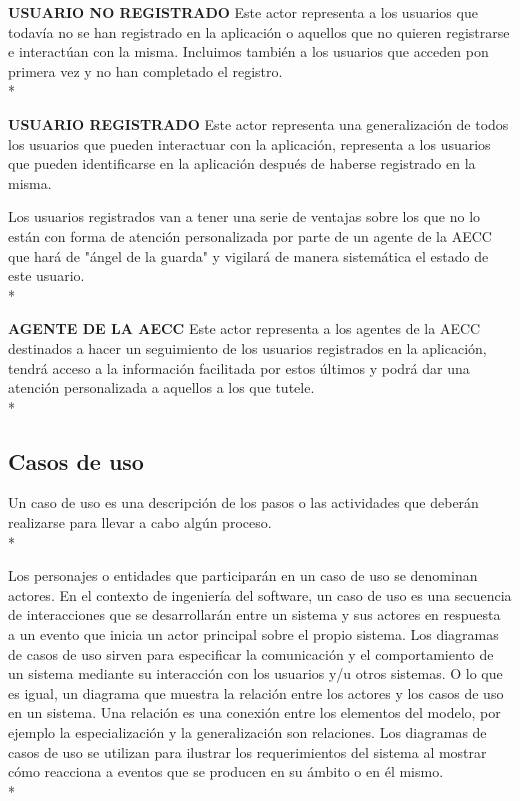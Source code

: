 \documentclass[../pfc.tex]{subfiles}
\begin{document}
	\textbf{USUARIO NO REGISTRADO}
	Este actor representa a los usuarios que todavía no se han registrado en la aplicación o aquellos que no quieren registrarse e interactúan con la misma. Incluimos también a los usuarios que acceden pon primera vez y no han completado el registro.\\*
	
	\textbf{USUARIO REGISTRADO}
	Este actor representa una generalización de todos los usuarios que pueden interactuar con la aplicación, representa a los usuarios que pueden identificarse en la aplicación después de haberse registrado en la misma.
	
	Los usuarios registrados van a tener una serie de ventajas sobre los que no lo están con forma de atención personalizada por parte de un agente de la AECC que hará de "ángel de la guarda" y vigilará de manera sistemática el estado de este usuario.\\*
	
	\textbf{AGENTE DE LA AECC}
	Este actor representa a los agentes de la AECC destinados a hacer un seguimiento de los usuarios registrados en la aplicación, tendrá acceso a la información facilitada por estos últimos y podrá dar una atención personalizada a aquellos a los que tutele.\\*
		
	\subsection{Casos de uso }
		
	Un caso de uso es una descripción de los pasos o las actividades que deberán realizarse para llevar a cabo algún proceso.\\*
	
	Los personajes o entidades que participarán en un caso de uso se denominan actores. En el contexto de ingeniería del software, un caso de uso es una secuencia de interacciones que se desarrollarán entre un sistema y sus actores en respuesta a un evento que inicia un actor principal sobre el propio sistema. Los diagramas de casos de uso sirven para especificar la comunicación y el comportamiento de un sistema mediante su interacción con los usuarios y/u otros sistemas. O lo que es igual, un diagrama que muestra la relación entre los actores y los casos de uso en un sistema. Una relación es una conexión entre los elementos del modelo, por ejemplo la especialización y la generalización son relaciones. Los diagramas de casos de uso se utilizan para ilustrar los requerimientos del sistema al mostrar cómo reacciona a eventos que se producen en su ámbito o en él mismo.\\*
	
\end{document}
